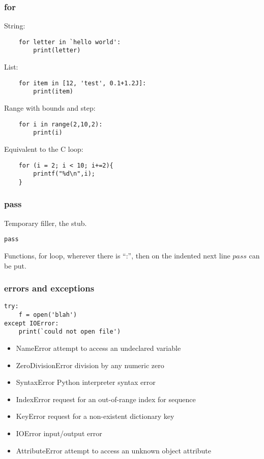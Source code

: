 \begin{frame}[fragile]\frametitle{for}
String:
  \begin{lstlisting}
	for letter in `hello world':
		print(letter)
  \end{lstlisting}
  List:
  \begin{lstlisting}
	for item in [12, 'test', 0.1+1.2J]:
		print(item)
  \end{lstlisting}
 Range with bounds and step:		
  \begin{lstlisting}
	for i in range(2,10,2):
		print(i)
  \end{lstlisting}
  Equivalent to the C loop:
    \begin{lstlisting}
	for (i = 2; i < 10; i+=2){
		printf("%d\n",i);
	}
  \end{lstlisting}
\end{frame}

\begin{frame}[fragile]\frametitle{pass}
Temporary filler, the stub.
  \begin{lstlisting}
pass
  \end{lstlisting}
  Functions, for loop, wherever there is ``:'', then on the indented next line $pass$ can be put.
\end{frame}

\begin{frame}[fragile]\frametitle{errors and exceptions}
  \begin{lstlisting}
try:
	f = open('blah')
except IOError:
	print(`could not open file')
  \end{lstlisting}
  \begin{itemize}
  \item NameError attempt to access an undeclared variable
  \item ZeroDivisionError division by any numeric zero
  \item SyntaxError Python interpreter syntax error
  \item IndexError request for an out-of-range index for sequence
  \item KeyError request for a non-existent dictionary key
  \item IOError input/output error
  \item AttributeError attempt to access an unknown object attribute
  \end{itemize}
\end{frame}


